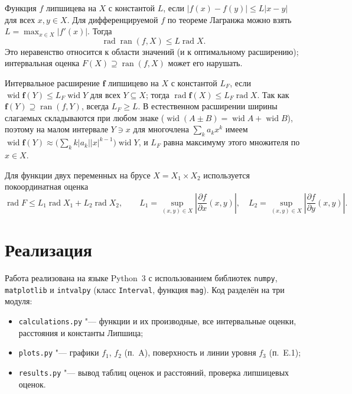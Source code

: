 \documentclass[12pt,a4paper]{article}
\newcommand{\ran}{\operatorname{ran}}
\newcommand{\rad}{\operatorname{rad}}
\newcommand{\wid}{\operatorname{wid}}
\newcommand{\bff}{\mathbf{f}}
\begin{document}
Функция $f$ липшицева на $X$ с константой $L$, если $|f(x)-f(y)|\le L|x-y|$ для всех $x,y\in X$. Для дифференцируемой $f$ по теореме Лагранжа можно взять $L=\max_{x\in X}|f'(x)|$. Тогда
\[
\rad\ran(f,X)\le L\rad X.
\]
Это неравенство относится к области значений (и к оптимальному расширению); интервальная оценка $F(X)\supseteq\ran(f,X)$ может его нарушать.

Интервальное расширение $\bff$ липшицево на $X$ с константой $L_F$, если $\wid\bff(Y)\le L_F\wid Y$ для всех $Y\subseteq X$; тогда $\rad\bff(X)\le L_F\rad X$. Так как $\bff(Y)\supseteq\ran(f,Y)$, всегда $L_F\ge L$. В естественном расширении ширины слагаемых складываются при любом знаке ($\wid(A\pm B)=\wid A+\wid B$), поэтому на малом интервале $Y\ni x$ для многочлена $\sum_k a_kx^k$ имеем $\wid\bff(Y)\approx\bigl(\sum_k k|a_k||x|^{k-1}\bigr)\wid Y$, и $L_F$ равна максимуму этого множителя по $x\in X$.

Для функции двух переменных на брусе $X=X_1\times X_2$ используется покоординатная оценка
\[
\rad F\le L_1\rad X_1+L_2\rad X_2,\qquad
L_1=\sup_{(x,y)\in X}\left|\frac{\partial f}{\partial x}(x,y)\right|,\quad
L_2=\sup_{(x,y)\in X}\left|\frac{\partial f}{\partial y}(x,y)\right|.
\]

\section{Реализация}

Работа реализована на языке Python~3 с использованием библиотек \texttt{numpy}, \texttt{matplotlib} и \texttt{intvalpy} (класс \texttt{Interval}, функция \texttt{mag}). Код разделён на три модуля:
\begin{itemize}
\item \texttt{calculations.py} "--- функции и их производные, все интервальные оценки, расстояния и константы Липшица;
\item \texttt{plots.py} "--- графики $f_1$, $f_2$ (п.~A), поверхность и линии уровня $f_3$ (п.~E.1);
\item \texttt{results.py} "--- вывод таблиц оценок и расстояний, проверка липшицевых оценок.
\end{itemize}
\end{document}
